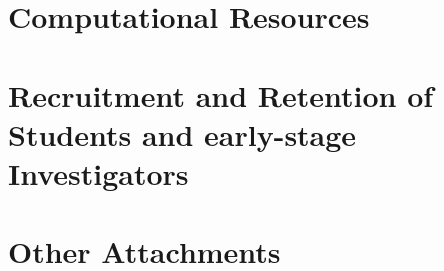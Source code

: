 \documentclass[11pt,article,crop=false]{standalone}
\begin{document}
\section{Computational Resources}\label{sec:resources}


\section{Recruitment and Retention of Students and early-stage Investigators}\label{sec:recruitment}


\section{Other Attachments}\label{sec:other}

\end{document}
